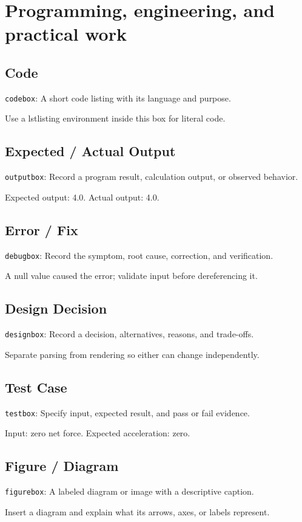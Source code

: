 \documentclass[11pt]{article}
\begin{document}
\clearpage
\section{Programming, engineering, and practical work}
\subsection{Code}
{\small\texttt{codebox}: A short code listing with its language and purpose.}
\begin{codebox}
Use a lstlisting environment inside this box for literal code.
\end{codebox}
\subsection{Expected / Actual Output}
{\small\texttt{outputbox}: Record a program result, calculation output, or observed behavior.}
\begin{outputbox}
Expected output: 4.0. Actual output: 4.0.
\end{outputbox}
\subsection{Error / Fix}
{\small\texttt{debugbox}: Record the symptom, root cause, correction, and verification.}
\begin{debugbox}
A null value caused the error; validate input before dereferencing it.
\end{debugbox}
\subsection{Design Decision}
{\small\texttt{designbox}: Record a decision, alternatives, reasons, and trade-offs.}
\begin{designbox}
Separate parsing from rendering so either can change independently.
\end{designbox}
\subsection{Test Case}
{\small\texttt{testbox}: Specify input, expected result, and pass or fail evidence.}
\begin{testbox}
Input: zero net force. Expected acceleration: zero.
\end{testbox}
\subsection{Figure / Diagram}
{\small\texttt{figurebox}: A labeled diagram or image with a descriptive caption.}
\begin{figurebox}
Insert a diagram and explain what its arrows, axes, or labels represent.
\end{figurebox}
\end{document}
